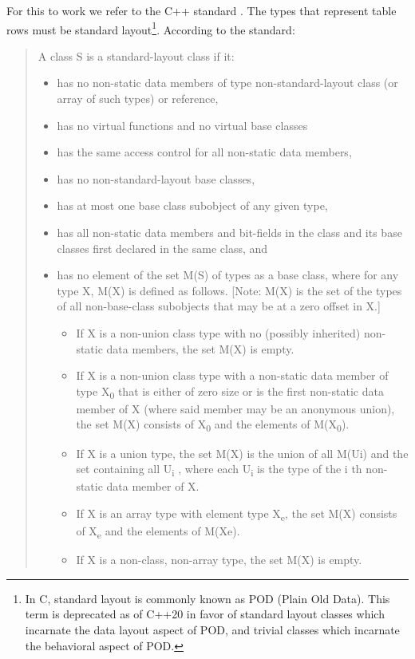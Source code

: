 For this to work we refer to the C++ standard
\cite{14:00-17:00ISOIEC14882}. The types that represent table rows
must be standard layout\footnote{In C, standard layout is commonly
known as POD (Plain Old Data). This term is deprecated as of C++20 in
favor of standard layout classes which incarnate the data layout
aspect of POD, and trivial classes which incarnate the behavioral
aspect of POD.}. According to the standard:

\begin{quote}
A class S is a standard-layout class if it:
\begin{itemize}
\item has no non-static data members of type non-standard-layout class (or
array of such types) or reference,
\item has no virtual functions and no virtual base classes
\item has the same access control for all non-static data members,
\item has no non-standard-layout base classes,
\item has at most one base class subobject of any given type,
\item has all non-static data members and bit-fields in the class and its
base classes first declared in the same class, and
\item has no element of the set M(S) of types as a base class, where for
any type X, M(X) is defined as follows. [Note: M(X) is the set of
the types of all non-base-class subobjects that may be at a zero
offset in X.]
\begin{itemize}
\item If X is a non-union class type with no (possibly inherited)
non-static data members, the set M(X) is empty.
\item If X is a non-union class type with a non-static data member of
type X\textsubscript{0} that is either of zero size or is the first non-static
data member of X (where said member may be an anonymous union),
the set M(X) consists of X\textsubscript{0} and the elements of M(X\textsubscript{0}).
\item If X is a union type, the set M(X) is the union of all M(Ui) and
the set containing all U\textsubscript{i} , where each U\textsubscript{i} is the type of the i
th non-static data member of X.
\item If X is an array type with element type X\textsubscript{e}, the set M(X) consists
of X\textsubscript{e} and the elements of M(Xe).
\item If X is a non-class, non-array type, the set M(X) is empty.
\end{itemize}
\end{itemize}
\end{quote}

